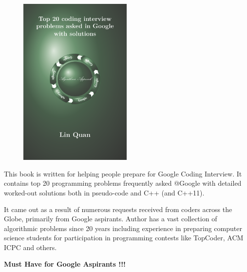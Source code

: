 \begin{figure}
  \begin{center}
    \includegraphics[width=0.5\textwidth]{top20/cover}
  \end{center}
\end{figure}

This book is written for helping people prepare for Google Coding Interview. It contains top 20 programming problems frequently asked @Google with detailed worked-out solutions both in pseudo-code and C++ (and C++11).

It came out as a result of numerous requests received from coders across the Globe, primarily from Google aspirants. Author has a vast collection of algorithmic problems since 20 years including experience in preparing computer science students for participation in programming contests like TopCoder, ACM ICPC and others.



\begin{center}
\textbf{Must Have for Google Aspirants !!!}
\end{center}


